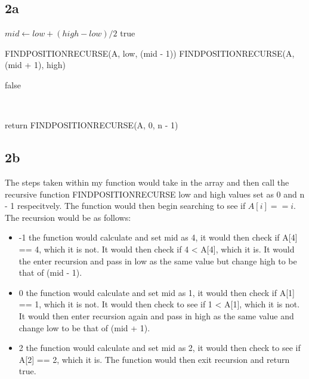 \documentclass[oneside, a4paper]{article}
\begin{document}
\subsection*{2a}
\begin{algorithmic}
            \State $mid \gets low + (high - low) / 2$
                \State \Return true    
            \EndIf
                
                \State \Return FINDPOSITIONRECURSE(A, low, (mid - 1))
            \Else
                \State \Return FINDPOSITIONRECURSE(A, (mid + 1), high)
            \EndIf

        \Else 
            \State \Return false    
        \EndIf
        
    \EndFunction
\end{algorithmic}
\
\
\begin{algorithmic}
        \State return FINDPOSITIONRECURSE(A, 0, n - 1)
    \EndFunction
\end{algorithmic}


\subsection*{2b}
The steps taken within my function would take in the array and then call the recursive function FINDPOSITIONRECURSE low and high values set as 0 and n - 1 respecitvely. The function would then begin searching to see if $A[i] == i$. The recursion would be as follows:

\begin{itemize}
    \item -1 \textrightarrow the function would calculate and set mid as 4, it would then check if A[4] == 4, which it is not. It would then check if 4 < A[4], which it is. It would the enter recursion and pass in low as the same value but change high to be that of (mid - 1). 
    \item 0 \textrightarrow the function would calculate and set mid as 1, it would then check if A[1] == 1, which it is not. It would then check to see if 1 < A[1], which it is not. It would then enter recursion again and pass in high as the same value and change low to be that of (mid + 1). 
    \item 2 \textrightarrow the function would calculate and set mid as 2, it would then check to see if A[2] == 2, which it is. The function would then exit recursion and return true.
\end{itemize}
\end{document}
